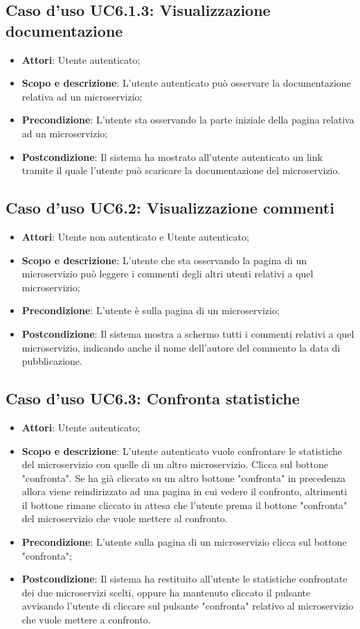 \documentclass[12pt,a4paper,titlepage]{article}
\begin{document}
	\subsection{Caso d'uso UC6.1.3: Visualizzazione documentazione}
	\label{UC6.1.3}
	\begin{itemize}
		\item \textbf{Attori}: Utente autenticato;
		\item \textbf{Scopo e descrizione}: L'utente autenticato può osservare la documentazione relativa ad un microservizio;
		\item \textbf{Precondizione}: L'utente sta osservando la parte iniziale della pagina relativa ad un microservizio;
		\item \textbf{Postcondizione}: Il sistema ha mostrato all'utente autenticato un link tramite il quale l'utente può scaricare la documentazione del microservizio.
	\end{itemize}
	\subsection{Caso d'uso UC6.2: Visualizzazione commenti}
	\label{UC6.2}
	\begin{itemize}
		\item \textbf{Attori}: Utente non autenticato e Utente autenticato;
		\item \textbf{Scopo e descrizione}: L'utente che sta osservando la pagina di un microservizio può leggere i commenti degli altri utenti relativi a quel microservizio;
		\item \textbf{Precondizione}: L'utente è sulla pagina di un microservizio;
		\item \textbf{Postcondizione}: Il sistema mostra a schermo tutti i commenti relativi a quel microservizio, indicando anche il nome dell'autore del commento la data di pubblicazione.
	\end{itemize}
	\subsection{Caso d'uso UC6.3: Confronta statistiche}
	\label{UC6.3}
	\begin{itemize}
		\item \textbf{Attori}: Utente autenticato;
		\item \textbf{Scopo e descrizione}: L'utente autenticato vuole confrontare le statistiche del microservizio con quelle di un altro microservizio. Clicca sul bottone "confronta". Se ha già cliccato su un altro bottone "confronta" in precedenza allora viene reindirizzato ad una pagina in cui vedere il confronto, altrimenti il bottone rimane cliccato in attesa che l'utente prema il bottone "confronta" del microservizio che vuole mettere al confronto.
		\item \textbf{Precondizione}: L'utente sulla pagina di un microservizio clicca sul bottone "confronta";
		\item \textbf{Postcondizione}: Il sistema ha restituito all'utente le statistiche confrontate dei due microservizi scelti, oppure ha mantenuto cliccato il pulsante avvisando l'utente di cliccare sul pulsante "confronta" relativo al microservizio che vuole mettere a confronto.
	\end{itemize}
\end{document}
